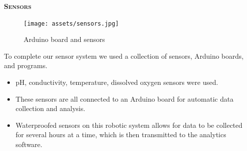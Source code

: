 \documentclass[final,t]{beamer}
\begin{document}
\begin{frame}{}
\begin{columns}
\begin{column}{.33\linewidth}
                \begin{block}{\textsc{\textbf{Sensors}}}
                    \vspace*{3mm}

                    \begin{figure}
                        \centering
                        \texttt{[image: assets/sensors.jpg]}
                        \caption{Arduino board and sensors}
                    \end{figure}
                    To complete our sensor system we used a collection of sensors,
                    Arduino boards, and programs.
                    \begin{itemize}
                    	\item pH, conductivity, temperature, dissolved oxygen sensors
                      were used.
                    	\item These sensors are all connected to an Arduino board
                      for automatic data collection and analysis.
                     	\item Waterproofed sensors on this robotic system allows for
                      data to be collected for several hours at a time, which is
                      then transmitted to the analytics software.
                     \end{itemize}

                    \vspace*{3mm}
                \end{block}


\end{column}
\end{columns}
\end{frame}
\end{document}
